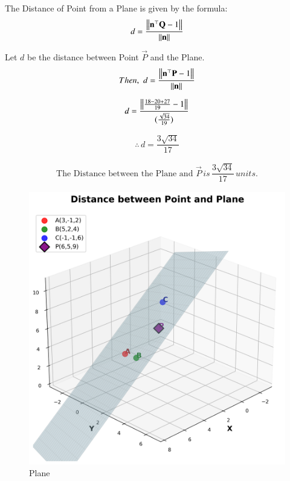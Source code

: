 \documentclass[journal]{IEEEtran}
\begin{document}
The Distance of Point from a Plane is given by the formula:
\begin{equation}
    d = \dfrac{\left\lVert\mathbf{n}^\top\mathbf{Q}-1\right\rVert}{\left\lVert\mathbf{n}\right\rVert}
\end{equation}

Let $d$ be the distance between Point $\vec{P}$ and the Plane.
\begin{equation}
    Then, \, \, d = \dfrac{\left\lVert\mathbf{n}^\top\mathbf{P}-1\right\rVert}{\left\lVert\mathbf{n}\right\rVert}
\end{equation}

\begin{equation}
    d= \dfrac{\left\lVert\frac{18-20+27}{19}-1\right\rVert}{(\frac{\sqrt{34}}{19})}
\end{equation}

\begin{equation}
\therefore \, d = \dfrac{3\sqrt{34}}{17}    
\end{equation}

\begin{align}
    \boxed{\text{The Distance between the Plane and } \vec{P} \, is \, \dfrac{3\sqrt{34}}{17} \, units.}
\end{align}

\begin{figure}[htbp]
    \centering
    \includegraphics[width=0.95\columnwidth]{figs/fig1.png}
    \caption{Plane}
    \label{fig:fig/fig1.png}
\end{figure}
\end{document}
